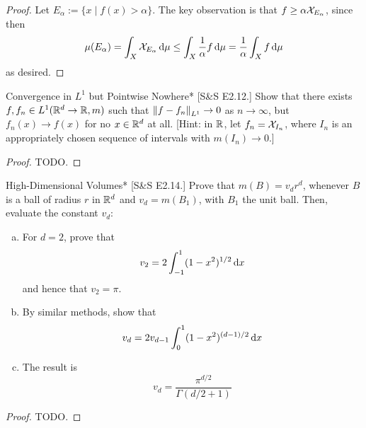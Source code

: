 \begin{proof}
    Let \(E_{\alpha} := \{x \mid f(x) > \alpha\}\). The key observation is that \(f \geq \alpha \mathcal{X}_{E_\alpha}\), since then
    \[
        \mu(E_\alpha) = \int_X \mathcal{X}_{E_\alpha} \, \mathrm{d}\mu 
        \leq \int_X \frac{1}{\alpha} f \, \mathrm{d} \mu 
        = \frac{1}{\alpha} \int_X f \, \mathrm{d} \mu
    \]
    as desired. 
\end{proof}

\begin{problem}{Convergence in \(L^1\) but Pointwise Nowhere}*
    [S\&S E2.12.] Show that there exists \(f, f_n \in L^1(\mathbb{R}^d \to \mathbb{R}, m)\) such that \(\norm{f - f_n}_{L^1} \to 0\) as \(n \to \infty\), but \(f_n(x) \to f(x)\) for no \(x \in \mathbb{R}^d\) at all. [Hint: in \(\mathbb{R}\), let \(f_n = \mathcal{X}_{I_n}\), where \(I_n\) is an appropriately chosen sequence of intervals with \(m(I_n) \to 0\).]
\end{problem}

\begin{proof}
    TODO. 
\end{proof}


\begin{problem}{High-Dimensional Volumes}*
    [S\&S E2.14.] Prove that \(m(B) = v_d r^d\), whenever \(B\) is a ball of radius \(r\) in \(\mathbb{R}^d\) and \(v_d = m(B_1)\), with \(B_1\) the unit ball. Then, evaluate the constant \(v_d\): 
    \begin{enumerate}[(a)]
        \itemsep0em
        \item For \(d = 2\), prove that 
        \[
            v_2 = 2 \int_{-1}^1 (1 - x^2)^{1/2} \, \mathrm{d}x
        \]
        and hence that \(v_2 = \pi\). 
        \item By similar methods, show that 
        \[
            v_d = 2v_{d-1} \int_0^1 (1 - x^2)^{(d-1)/2} \, \mathrm{d}x
        \]
        \item The result is 
        \[
            v_d = \frac{\pi^{d/2}}{\Gamma(d/2 + 1)}
        \]
    \end{enumerate}
\end{problem}

\begin{proof}
    TODO. 
\end{proof}


